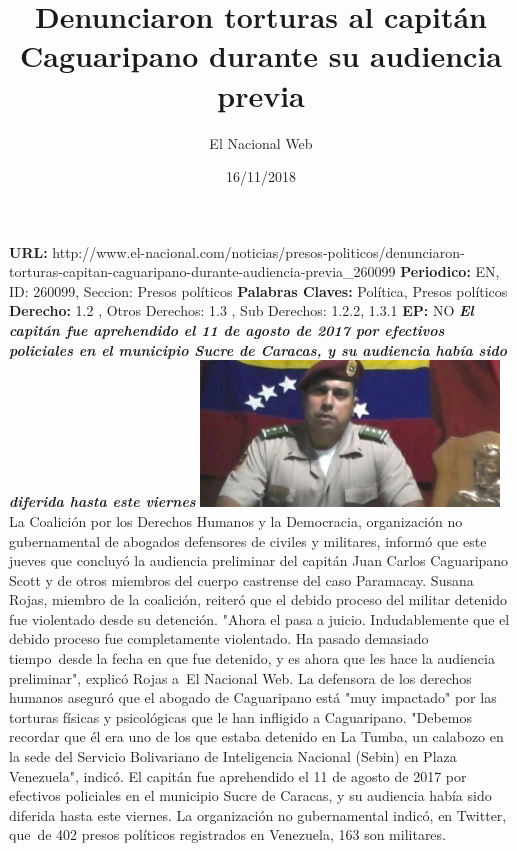 \documentclass{article}%
\title{\textbf{Denunciaron torturas al capitán Caguaripano durante su audiencia previa}}%
\author{El Nacional Web}%
\date{16/11/2018}%
\begin{document}
%
\normalsize%
\maketitle%
\textbf{URL: }%
http://www.el{-}nacional.com/noticias/presos{-}politicos/denunciaron{-}torturas{-}capitan{-}caguaripano{-}durante{-}audiencia{-}previa\_260099\newline%
%
\textbf{Periodico: }%
EN, %
ID: %
260099, %
Seccion: %
Presos políticos\newline%
%
\textbf{Palabras Claves: }%
Política, Presos políticos\newline%
%
\textbf{Derecho: }%
1.2%
, Otros Derechos: %
1.3%
, Sub Derechos: %
1.2.2, 1.3.1%
\newline%
%
\textbf{EP: }%
NO\newline%
\newline%
%
\textbf{\textit{El capitán fue aprehendido el 11 de agosto de 2017 por efectivos policiales en el municipio Sucre de Caracas, y su audiencia había sido diferida hasta este viernes}}%
\newline%
\newline%
%
\includegraphics[width=300px]{58.jpg}%
\newline%
%
La Coalición por los Derechos Humanos y la Democracia, organización no gubernamental de abogados defensores de civiles y militares, informó que este jueves que concluyó la audiencia preliminar del capitán Juan Carlos Caguaripano Scott y de otros miembros del cuerpo castrense del caso Paramacay.%
\newline%
%
Susana Rojas, miembro de la coalición, reiteró que el debido proceso del militar detenido fue violentado desde su detención.%
\newline%
%
"Ahora el pasa a juicio. Indudablemente que el debido proceso fue completamente violentado. Ha pasado demasiado tiempo~desde la fecha en que fue detenido, y es ahora que les hace la audiencia preliminar", explicó Rojas a~El Nacional Web.%
\newline%
%
La defensora de los derechos humanos aseguró que el abogado de Caguaripano está "muy impactado" por las torturas físicas y psicológicas que le han infligido a Caguaripano.%
\newline%
%
"Debemos recordar que él era uno de los que estaba detenido en La Tumba, un calabozo en la sede del Servicio Bolivariano de Inteligencia Nacional (Sebin) en Plaza Venezuela", indicó.%
\newline%
%
El capitán fue aprehendido el 11 de agosto de 2017 por efectivos policiales en el municipio Sucre de Caracas, y su audiencia había sido diferida hasta este viernes.%
\newline%
%
La organización no gubernamental indicó, en Twitter, que~de 402 presos políticos registrados en Venezuela, 163 son militares.%
\newline%
%
\end{document}
